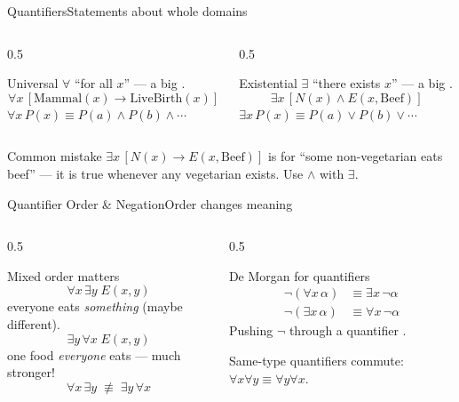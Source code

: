 \documentclass[aspectratio=169,11pt]{beamer}
\begin{document}
\begin{frame}{Quantifiers}{Statements about whole domains}
  \begin{columns}[T]
    \begin{column}{0.5\textwidth}
      \begin{block}{Universal $\forall$}
        \small ``for all $x$'' — a big .
        \[ \forall x\,[\mathrm{Mammal}(x) \rightarrow \mathrm{LiveBirth}(x)] \]
        \scriptsize $\forall x\,P(x) \equiv P(a)\land P(b)\land\cdots$
      \end{block}
    \end{column}
    \begin{column}{0.5\textwidth}
      \begin{exampleblock}{Existential $\exists$}
        \small ``there exists $x$'' — a big .
        \[ \exists x\,[N(x) \land E(x,\text{Beef})] \]
        \scriptsize $\exists x\,P(x) \equiv P(a)\lor P(b)\lor\cdots$
      \end{exampleblock}
    \end{column}
  \end{columns}
  \vspace{0.3em}
  \begin{alertblock}{Common mistake}
    \small $\exists x\,[N(x) \rightarrow E(x,\text{Beef})]$ is  for
    ``some non-vegetarian eats beef'' — it is true whenever any vegetarian exists.
    Use $\land$ with $\exists$.
  \end{alertblock}
\end{frame}

\begin{frame}{Quantifier Order \& Negation}{Order changes meaning}
  \begin{columns}[T]
    \begin{column}{0.5\textwidth}
      \begin{block}{Mixed order matters}
        \small
        \[ \forall x\,\exists y\; E(x,y) \]
        everyone eats \emph{something} (maybe different).
        \[ \exists y\,\forall x\; E(x,y) \]
        one food \emph{everyone} eats — much stronger!
        \[ \forall x\,\exists y \;\not\equiv\; \exists y\,\forall x \]
      \end{block}
    \end{column}
    \begin{column}{0.5\textwidth}
      \begin{exampleblock}{De Morgan for quantifiers}
        \small
        \begin{align*}
          \neg(\forall x\,\alpha) &\equiv \exists x\,\neg\alpha \\
          \neg(\exists x\,\alpha) &\equiv \forall x\,\neg\alpha
        \end{align*}
        \scriptsize Pushing $\neg$ through a quantifier .
      \end{exampleblock}
      \centering\scriptsize
      Same-type quantifiers commute: $\forall x\forall y \equiv \forall y\forall x$.
    \end{column}
  \end{columns}
\end{frame}
\end{document}
